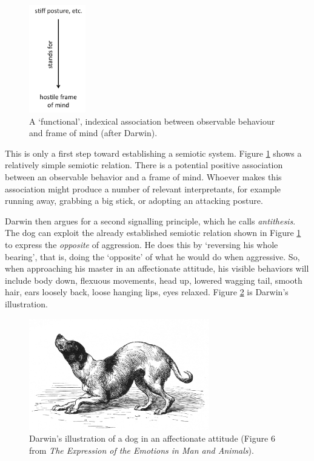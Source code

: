 \begin{figure}[p]
\includegraphics[width=0.22\textwidth,height=\textheight,keepaspectratio]{figures/Fig02}
\caption{A \textquoteleft functional', indexical association between observable 
behaviour and frame of mind (after Darwin).}
\label{functionalassoc}
\end{figure}


This is only a first step toward establishing a semiotic system. Figure 
\ref{functionalassoc} shows a relatively simple semiotic relation. There is a potential positive association between an 
observable behavior and a frame of mind. Whoever makes this association might produce a 
number of relevant interpretants, for example running away, grabbing a big 
stick, or adopting an attacking posture. 



Darwin then argues for a second signalling principle, which he calls \textit{antithesis}. The dog can exploit the already established semiotic 
relation shown in Figure \ref{functionalassoc} to express the \textit{opposite} 
of aggression. He does this by \textquoteleft reversing his whole bearing', that is, doing the 
`opposite' of what he would do when aggressive. So, when approaching 
his master in an affectionate attitude, his visible behaviors will include body 
down, flexuous movements, head up, lowered wagging tail, smooth hair, 
ears loosely back, loose hanging lips, eyes relaxed. Figure \ref{darwin2} is 
Darwin's illustration.


\begin{figure}[h]
\includegraphics[width=0.70\textwidth,keepaspectratio]{figures/Fig03}
\caption{Darwin's illustration of a dog in an affectionate attitude 
(Figure 6 from \textit{The Expression of the Emotions in Man and 
Animals}).}
\label{darwin2}
\end{figure}




